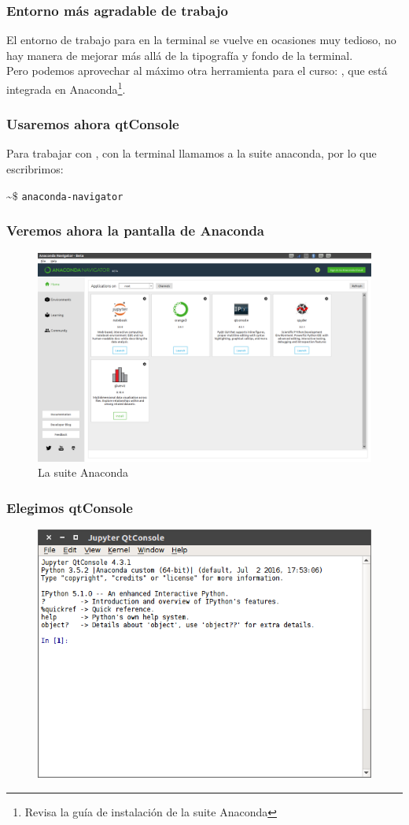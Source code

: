 {
\begin{frame}
\frametitle{Entorno más agradable de trabajo}
El entorno de trabajo para \python{} en la terminal se vuelve en ocasiones muy tedioso, no hay manera de mejorar más allá de la tipografía y fondo de la terminal.
\\
\bigskip
Pero podemos aprovechar al máximo otra herramienta para el curso: , que está integrada en Anaconda\footnote{Revisa la guía de instalación de la suite Anaconda}.
\end{frame}
\begin{frame}
\frametitle{Usaremos ahora qtConsole}
Para trabajar con , con la terminal llamamos a la suite anaconda, por lo que escribrimos:
\begin{center}
\textasciitilde $\$$ \texttt{anaconda-navigator} \keys{\return}
\end{center}
\end{frame}
\begin{frame}
\frametitle{Veremos ahora la pantalla de Anaconda}
\begin{figure}
	\centering
	\includegraphics[scale=0.2]{anaconda_01.png}
	\caption{La suite Anaconda}
\end{figure}
\end{frame}
\begin{frame}
\frametitle{Elegimos qtConsole}
\begin{figure}
	\centering
	\includegraphics[scale=0.35]{qtConsole_01.png}

\end{figure}
\end{frame}}
